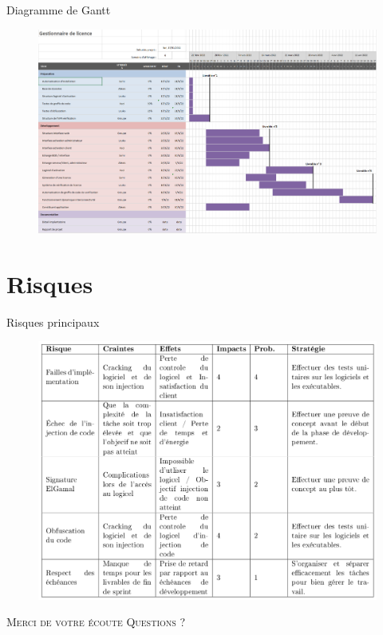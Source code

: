 \documentclass{cubeamer}
\begin{document}
\begin{frame}{Diagramme de Gantt}
    \begin{figure}
        \centering
        \includegraphics[scale=0.22]{img/Gantt.png}
    \end{figure}
\end{frame}

\section{Risques}

\begin{frame}{Risques principaux}
    \begin{figure}
        \centering
        \vspace{-2mm}
        \includegraphics[scale=0.18]{img/risques.png}
    \end{figure}
\end{frame}

\begin{frame}[standout]
    \Huge\textsc{Merci de votre écoute}
    \vfill
    \LARGE\textsc{Questions ?}
\end{frame}
\end{document}

